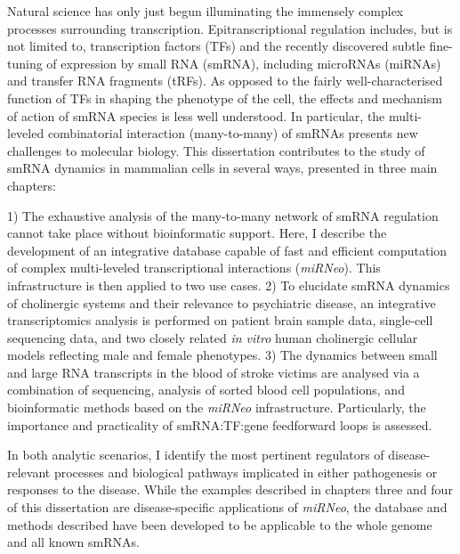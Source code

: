 
Natural science has only just begun illuminating the immensely complex processes surrounding transcription. Epitranscriptional regulation includes, but is not limited to, transcription factors (TFs) and the recently discovered subtle fine-tuning of expression by small RNA (smRNA), including microRNAs (miRNAs) and transfer RNA fragments (tRFs). As opposed to the fairly well-characterised function of TFs in shaping the phenotype of the cell, the effects and mechanism of action of smRNA species is less well understood. In particular, the multi-leveled combinatorial interaction (many-to-many) of smRNAs presents new challenges to molecular biology. This dissertation contributes to the study of smRNA dynamics in mammalian cells in several ways, presented in three main chapters: 

1) The exhaustive analysis of the many-to-many network of smRNA regulation cannot take place without bioinformatic support. Here, I describe the development of an integrative database capable of fast and efficient computation of complex multi-leveled transcriptional interactions (\emph{miRNeo}). This infrastructure is then applied to two use cases. 2) To elucidate smRNA dynamics of cholinergic systems and their relevance to psychiatric disease, an integrative transcriptomics analysis is performed on patient brain sample data, single-cell sequencing data, and two closely related \emph{in vitro} human cholinergic cellular models reflecting male and female phenotypes. 3) The dynamics between small and large RNA transcripts in the blood of stroke victims are analysed via a combination of sequencing, analysis of sorted blood cell populations, and bioinformatic methods based on the \emph{miRNeo} infrastructure. Particularly, the importance and practicality of smRNA:TF:gene feedforward loops is assessed. 

In both analytic scenarios, I identify the most pertinent regulators of disease-relevant processes and biological pathways implicated in either pathogenesis or responses to the disease. While the examples described in chapters three and four of this dissertation are disease-specific applications of \emph{miRNeo}, the database and methods described have been developed to be applicable to the whole genome and all known smRNAs.

